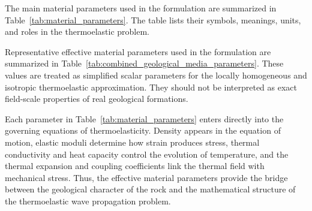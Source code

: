 The main material parameters used in the formulation are summarized in Table~\ref{tab:material_parameters}. The table lists their symbols, meanings, units, and roles in the thermoelastic problem.

Representative effective material parameters used in the formulation are summarized in Table~\ref{tab:combined_geological_media_parameters}. These values are treated as simplified scalar parameters for the locally homogeneous and isotropic thermoelastic approximation. They should not be interpreted as exact field-scale properties of real geological formations.



Each parameter in Table~\ref{tab:material_parameters} enters directly into the governing equations of thermoelasticity. Density appears in the equation of motion, elastic moduli determine how strain produces stress, thermal conductivity and heat capacity control the evolution of temperature, and the thermal expansion and coupling coefficients link the thermal field with mechanical stress. Thus, the effective material parameters provide the bridge between the geological character of the rock and the mathematical structure of the thermoelastic wave propagation problem.


